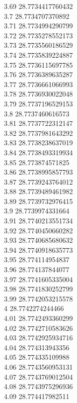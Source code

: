 {3.69	28.7734417760432\\
3.7	28.7734707370892\\
3.71	28.7734994290799\\
3.72	28.7735278552173\\
3.73	28.7735560186529\\
3.74	28.7735839224887\\
3.75	28.7736115697785\\
3.76	28.7736389635287\\
3.77	28.7736661066993\\
3.78	28.7736930022048\\
3.79	28.7737196529153\\
3.8	28.7737460616573\\
3.81	28.7737722312147\\
3.82	28.7737981643292\\
3.83	28.7738238637019\\
3.84	28.7738493319934\\
3.85	28.773874571825\\
3.86	28.7738995857793\\
3.87	28.7739243764012\\
3.88	28.7739489461982\\
3.89	28.7739732976415\\
3.9	28.7739974331664\\
3.91	28.7740213551734\\
3.92	28.7740450660282\\
3.93	28.7740685680632\\
3.94	28.7740918635773\\
3.95	28.774114954837\\
3.96	28.774137844077\\
3.97	28.7741605335004\\
3.98	28.7741830252799\\
3.99	28.7742053215578\\
4	28.7742274244466\\
4.01	28.7742493360299\\
4.02	28.7742710583626\\
4.03	28.7742925934716\\
4.04	28.774313943356\\
4.05	28.774335109988\\
4.06	28.7743560953131\\
4.07	28.7743769012504\\
4.08	28.7743975296936\\
4.09	28.774417982511\\
}
